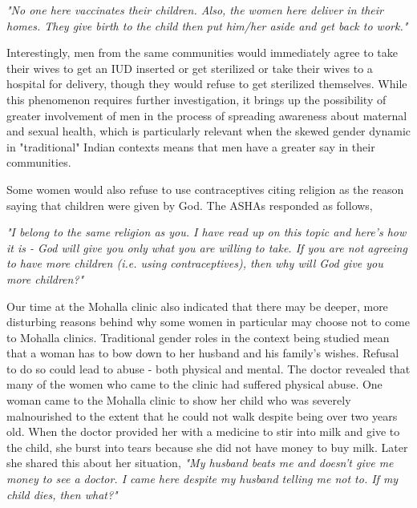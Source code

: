 \textit{"No one here vaccinates their children. Also, the women here deliver in their homes. They give birth to the child then put him/her aside and get back to work."} 

Interestingly, men from the same communities would immediately agree to take their wives to get an IUD inserted or get sterilized or take their wives to a hospital for delivery, though they would refuse to get sterilized themselves. While this phenomenon requires further investigation, it brings up the possibility of greater involvement of men in the process of spreading awareness about maternal and sexual health, which is particularly relevant when the skewed gender dynamic in "traditional" Indian contexts means that men have a greater say in their communities. %

Some women would also refuse to use contraceptives citing religion as the reason saying that children were given by God. The ASHAs responded as follows,

\textit{"I belong to the same religion as you. I have read up on this topic and here's how it is - God will give you only what you are willing to take. If you are not agreeing to have more children (i.e. using contraceptives), then why will God give you more children?"}

Our time at the Mohalla clinic also indicated that there may be deeper, more disturbing reasons behind why some women in particular may choose not to come to Mohalla clinics. Traditional gender roles in the context being studied mean that a woman has to bow down to her husband and his family's wishes. Refusal to do so could lead to abuse - both physical and mental. The doctor revealed that many of the women who came to the clinic had suffered physical abuse. One woman came to the Mohalla clinic to show her child who was severely malnourished to the extent that he could not walk despite being over two years old. When the doctor provided her with a medicine to stir into milk and give to the child, she burst into tears because she did not have money to buy milk. Later she shared this about her situation, \textit{"My husband beats me and doesn’t give me money to see a doctor. I came here despite my husband telling me not to. If my child dies, then what?"}

